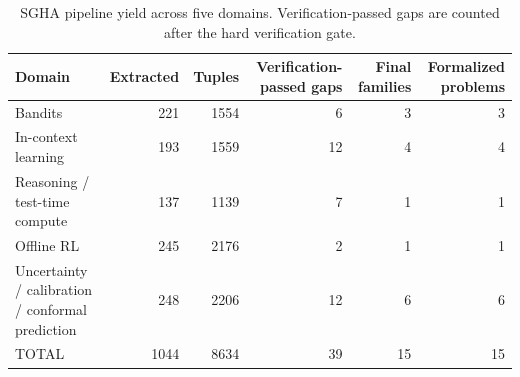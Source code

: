 \begin{table}[htbp]
\centering
\caption{SGHA pipeline yield across five domains. Verification-passed gaps are counted after the hard verification gate.}
\label{tab:sgha\_pipeline\_yield}
\begin{tabular}{lrrrrr}
\toprule
Domain & Extracted & Tuples & Verification-passed gaps & Final families & Formalized problems \\
\midrule
Bandits & 221 & 1554 & 6 & 3 & 3 \\
In-context learning & 193 & 1559 & 12 & 4 & 4 \\
Reasoning / test-time compute & 137 & 1139 & 7 & 1 & 1 \\
Offline RL & 245 & 2176 & 2 & 1 & 1 \\
Uncertainty / calibration / conformal prediction & 248 & 2206 & 12 & 6 & 6 \\
TOTAL & 1044 & 8634 & 39 & 15 & 15 \\
\bottomrule
\end{tabular}
\end{table}
